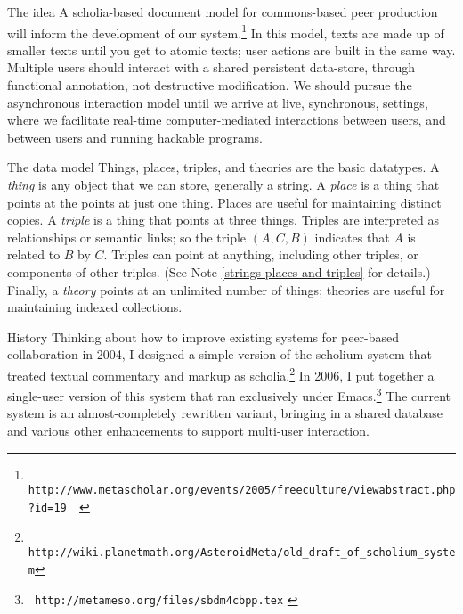 \begin{notate}{The idea} \label{theoretical-context}
A scholia-based document model for commons-based peer
production will inform the development of our
system.\footnote{{\tt
http://www.metascholar.org/events/2005/freeculture/viewabstract.php?id=19
\label{corneli-krowne}
}}
In this model, texts are made up of smaller texts until
you get to atomic texts; user actions are built in the
same way.  Multiple users should interact with a shared
persistent data-store, through functional annotation, not
destructive modification.  We should pursue the
asynchronous interaction model until we arrive at live,
synchronous, settings, where we facilitate real-time
computer-mediated interactions between users, and between
users and running hackable programs.
\end{notate}

\begin{notate}{The data model} \label{data-model}
Things, places, triples, and theories are the basic
datatypes.  A \emph{thing} is any object that we can
store, generally a string.  A \emph{place} is a thing that
points at the points at just one thing.  Places are useful
for maintaining distinct copies.  A \emph{triple} is a
thing that points at three things.  Triples are
interpreted as relationships or semantic links; so the
triple $(A, C, B)$ indicates that $A$ is related to $B$ by
$C$.  Triples can point at anything, including other
triples, or components of other triples.  (See Note
\ref{strings-places-and-triples} for details.)  Finally, a
\emph{theory} points at an unlimited number of things;
theories are useful for maintaining indexed collections.
\end{notate}

\begin{notate}{History}
Thinking about how to improve existing systems for
peer-based collaboration in 2004, I designed a simple
version of the scholium system that treated textual
commentary and markup as scholia.\footnote{{\tt
    http://wiki.planetmath.org/AsteroidMeta/old\_draft\_of\_scholium\_system}}
In 2006, I put together a single-user version of this
system that ran exclusively under Emacs.\footnote{{\tt
    http://metameso.org/files/sbdm4cbpp.tex} \label{old-version}}
The current system is an almost-completely rewritten
variant, bringing in a shared database and various other
enhancements to support multi-user interaction.
\end{notate}

